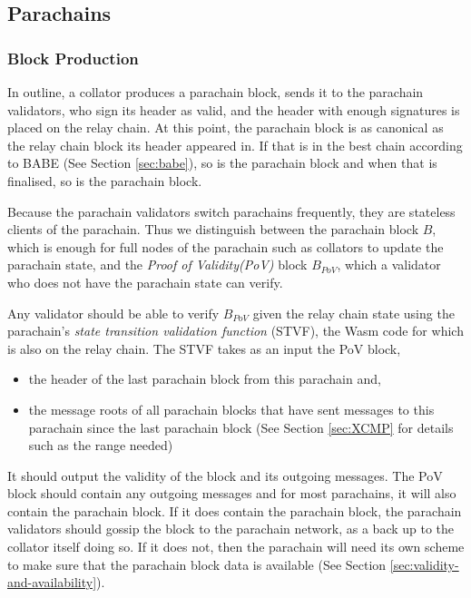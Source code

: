 \subsection{Parachains}\label{sec:parachains}

\subsubsection{Block Production}\label{sec:parachainblockproduction}
In outline, a collator produces a parachain block, sends it to the parachain validators,
who sign its header as valid, and the header with enough signatures is placed on the relay chain.
At this point, the parachain block is as canonical as the relay chain block its header appeared in.
If that is in the best chain according to BABE (See Section \ref{sec:babe}), so is the parachain block and when that is finalised, so is the parachain block.

Because the parachain validators switch parachains frequently, they are stateless clients of the parachain.
Thus we distinguish between the parachain block $B$, which is enough for full nodes of the parachain such as collators to update the parachain state,
and the {\em Proof of Validity(PoV)} block $B_{PoV}$, which a validator who does not have the parachain state can verify.

Any validator should be able to verify $B_{PoV}$ given the relay chain state using the parachain's {\em state transition validation function} (STVF),
the Wasm code for which is also on the relay chain.
The STVF takes as an input the PoV block,
\begin{itemize}
	\item  the header of the last parachain block from this parachain and,
	\item the message roots of all parachain blocks that have sent messages to this parachain since the last parachain block
	(See Section \ref{sec:XCMP} for details such as the range needed)
\end{itemize}
It should output the validity of the block and its outgoing messages.
The PoV block should contain any outgoing messages and for most parachains, it will also contain the parachain block.
If it does contain the parachain block, the parachain validators should gossip the block to the parachain network, as a back up to the collator itself doing so.
If it does not, then the parachain will need its own scheme to make sure that the parachain block data is available (See Section \ref{sec:validity-and-availability}).

